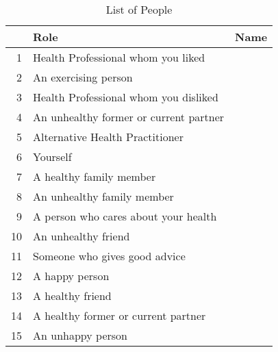 \begin{table}[ht]
\centering
\begin{tabular}{rll}
  \hline
 & Role & Name \\ 
  \hline
1 & Health Professional whom you liked &  \\ 
  2 & An exercising person &  \\ 
  3 & Health Professional whom you disliked &  \\ 
  4 & An unhealthy former or current partner &  \\ 
  5 & Alternative Health Practitioner &  \\ 
  6 & Yourself &  \\ 
  7 & A healthy family member &  \\ 
  8 & An unhealthy family member &  \\ 
  9 & A person who cares about your health &  \\ 
  10 & An unhealthy friend &  \\ 
  11 & Someone who gives good advice &  \\ 
  12 & A happy person &  \\ 
  13 & A healthy friend &  \\ 
  14 & A healthy former or current partner &  \\ 
  15 & An unhappy person &  \\ 
   \hline
\end{tabular}
\caption{List of People} 
\label{tab:peoplelist}
\end{table}